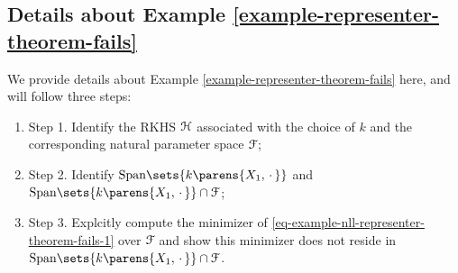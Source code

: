 \subsection{Details about Example \ref{example-representer-theorem-fails}}\label{proof-example-representer-theorem-fails}

	We provide details about Example \ref{example-representer-theorem-fails} here, and will follow three steps: 
	\begin{enumerate}
		\item[] Step 1. Identify the RKHS $\mathcal{H}$ associated with the choice of $k$ and the corresponding natural parameter space $\mathcal{F}$; 
		\item[] Step 2. Identify $\mathrm{Span} \sets{k \parens{X_1, \,\cdot\,}}$ and $\mathrm{Span} \sets{k \parens{X_1, \,\cdot\,}} \cap \calF$; 
		\item[] Step 3. Explcitly compute the minimizer of \eqref{eq-example-nll-representer-theorem-fails-1} over $\mathcal{F}$ and show this minimizer does not reside in $\mathrm{Span} \sets{k \parens{X_1, \,\cdot\,}} \cap \calF$. 
	\end{enumerate}
	
